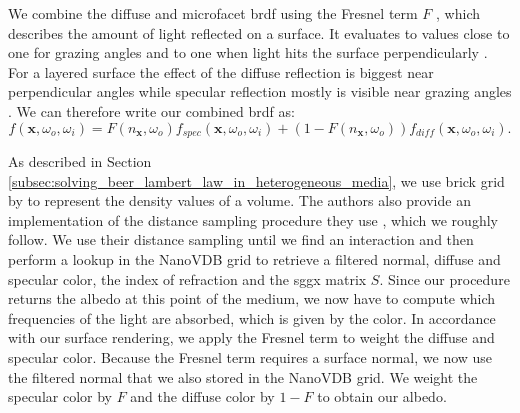 We combine the diffuse and microfacet \ac{brdf} using the Fresnel term $F$ \cite{fresnel}, which describes the amount of light reflected on a surface.
It evaluates to values close to one for grazing angles and to one when light hits the surface perpendicularly \cite{pbr}.
For a layered surface the effect of the diffuse reflection is biggest near perpendicular angles while specular reflection mostly is visible near grazing angles \cite{pbr}.
We can therefore write our combined \ac{brdf} as:
\begin{equation*}
    f(\boldsymbol{x}, \omega_o, \omega_i) = F(n_{\boldsymbol{x}}, \omega_o)f_{spec}(\boldsymbol{x}, \omega_o, \omega_i) + (1 - F(n_{\boldsymbol{x}}, \omega_o))f_{diff}(\boldsymbol{x}, \omega_o, \omega_i).
\end{equation*}

As described in Section \ref{subsec:solving_beer_lambert_law_in_heterogeneous_media}, we use brick grid by \citeauthor{brick_grid} \cite{brick_grid} to represent the density values of a volume.
The authors also provide an implementation of the distance sampling procedure they use \cite{brick_grid}, which we roughly follow.
We use their distance sampling until we find an interaction and then perform a lookup in the NanoVDB grid to retrieve a filtered normal, diffuse and specular color, the index of refraction and the \ac{sggx} matrix $S$.
Since our procedure returns the albedo at this point of the medium, we now have to compute which frequencies of the light are absorbed, which is given by the color.
In accordance with our surface rendering, we apply the Fresnel term to weight the diffuse and specular color.
Because the Fresnel term requires a surface normal, we now use the filtered normal that we also stored in the NanoVDB grid.
We weight the specular color by $F$ and the diffuse color by $1-F$ to obtain our albedo.

